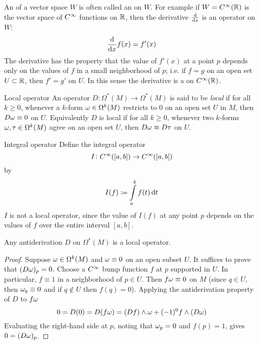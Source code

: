 An  of a vector space \(W\) is often called an  on \(W\).
For example if \(W = C^\infty(\mathbb{R})\) is the vector space of \(C^\infty\) functions on \(\mathbb{R}\), then the derivative \(\dv{x}\) is an operator on \(W\):
\[
    \dv{x} f(x) = f'(x)
\]
The derivative has the property that the value of \(f'(x)\) at a point \(p\) depends only on the values of \(f\) in a small neighborhood of \(p\); i.e. if \(f = g\) on an open set \(U \subset \mathbb{R}\), then \(f' = g'\) on \(U\). 
In this sense the derivative is a  on \(C^\infty(\mathbb{R})\).

\begin{definition}{Local operator}{}
    An operator \(D \colon \Omega^*(M) \rightarrow \Omega^* (M)\) is said to be \textit{local} if for all \(k \geq 0\), whenever a \(k\)-form \(\omega \in \Omega^k(M)\) restricts to 0 on an open set \(U\) in \(M\), then \(D\omega \equiv 0\) on \(U\).
    Equivalently \(D\) is local if for all \(k \geq 0 \), whenever two \(k\)-forms \(\omega, \tau \in \Omega^k(M)\) agree on an open set \(U\), then \(D \omega \equiv D \tau\) on \(U\).
\end{definition}
\begin{example}{Integral operator}{}
    Define the integral operator 
    \[
        I \colon C^\infty ([a,b]) \rightarrow C^\infty ([a,b])
    \] 
    by 
    \[
        I(f) \coloneqq \int\limits_a^b f(t) \dif t   
    \]
    \(I\) is not a local operator, since the value of \(I(f)\) at any point \(p\) depends on the values of \(f\) over the entire interval \([a,b]\).
\end{example}

\begin{proposition}{}{}
    Any antiderivation \(D\) on \(\Omega^*(M)\) is a local operator.
\end{proposition}
\begin{proof}
    Suppose \(\omega \in \Omega^k(M)\) and \(\omega \equiv 0\) on an open subset \(U\).
    It suffices to prove that \((D\omega)_p = 0\).
    Choose a \(C^\infty\) bump function \(f\) at \(p\) supported in \(U\).
    In particular, \(f \equiv 1\) in a neighborhood of \(p \in U\).
    Then \(f \omega \equiv 0\) on \(M\) (since \(q \in U\), then \(\omega_q \equiv 0\) and if \(q \notin U\) then \(f(q) = 0\)).
    Applying the antiderivation property of \(D\) to \(f\omega\)
    \[
        0 = D(0) = D(f\omega) = (Df) \wedge \omega + (-1)^0 f \wedge (D \omega)    
    \]
    Evaluating the right-hand side at \(p\), noting that \(\omega_p =0\) and \(f(p) =1\), gives \(0 = (D\omega)_p\).
\end{proof}

